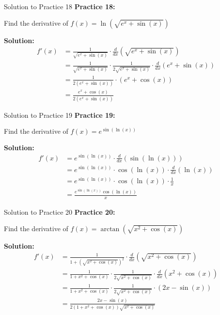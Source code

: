 \documentclass[aspectratio=169]{beamer}
\begin{document}
\begin{frame}{Solution to Practice 18}
\textbf{Practice 18:}

Find the derivative of $f(x) = \ln(\sqrt{e^x + \sin(x)})$

\textbf{Solution:}
\[
\begin{aligned}
  f'(x) &= \frac{1}{\sqrt{e^x + \sin(x)}} \cdot \frac{d}{dx}(\sqrt{e^x + \sin(x)}) \\
  &= \frac{1}{\sqrt{e^x + \sin(x)}} \cdot \frac{1}{2\sqrt{e^x + \sin(x)}} \cdot \frac{d}{dx}(e^x + \sin(x)) \\
  &= \frac{1}{2(e^x + \sin(x))} \cdot (e^x + \cos(x)) \\
  &= \frac{e^x + \cos(x)}{2(e^x + \sin(x))}
\end{aligned}
\]
\end{frame}

\begin{frame}{Solution to Practice 19}
\textbf{Practice 19:}

Find the derivative of $f(x) = e^{\sin(\ln(x))}$

\textbf{Solution:}
\[
\begin{aligned}
  f'(x) &= e^{\sin(\ln(x))} \cdot \frac{d}{dx}(\sin(\ln(x))) \\
  &= e^{\sin(\ln(x))} \cdot \cos(\ln(x)) \cdot \frac{d}{dx}(\ln(x)) \\
  &= e^{\sin(\ln(x))} \cdot \cos(\ln(x)) \cdot \frac{1}{x} \\
  &= \frac{e^{\sin(\ln(x))}\cos(\ln(x))}{x}
\end{aligned}
\]
\end{frame}

\begin{frame}{Solution to Practice 20}
\textbf{Practice 20:}

Find the derivative of $f(x) = \arctan(\sqrt{x^2 + \cos(x)})$

\textbf{Solution:}
\[
\begin{aligned}
  f'(x) &= \frac{1}{1 + (\sqrt{x^2 + \cos(x)})^2} \cdot \frac{d}{dx}(\sqrt{x^2 + \cos(x)}) \\
  &= \frac{1}{1 + x^2 + \cos(x)} \cdot \frac{1}{2\sqrt{x^2 + \cos(x)}} \cdot \frac{d}{dx}(x^2 + \cos(x)) \\
  &= \frac{1}{1 + x^2 + \cos(x)} \cdot \frac{1}{2\sqrt{x^2 + \cos(x)}} \cdot (2x - \sin(x)) \\
  &= \frac{2x - \sin(x)}{2(1 + x^2 + \cos(x))\sqrt{x^2 + \cos(x)}}
\end{aligned}
\]
\end{frame}
\end{document}
